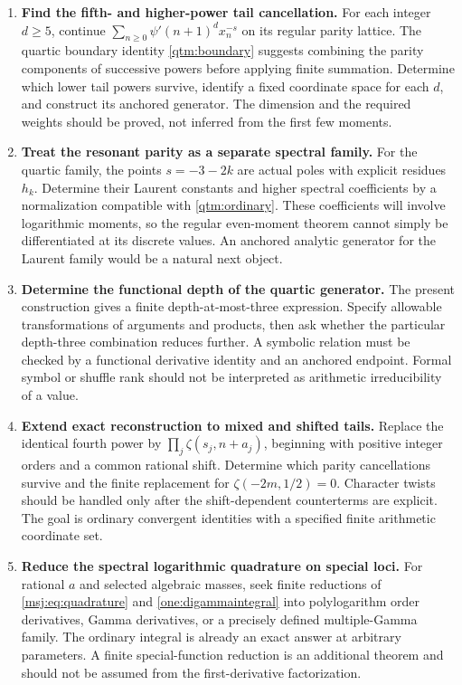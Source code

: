 \begin{enumerate}[leftmargin=*,label=\textbf{R\arabic*.}]
\item \textbf{Find the fifth- and higher-power tail cancellation.}
For each integer $d\ge5$, continue
$\sum_{n\ge0}\psi'(n+1)^d x_n^{-s}$ on its regular parity lattice.
The quartic boundary identity \eqref{qtm:boundary} suggests combining
the parity components of successive powers before applying finite
summation.  Determine which lower tail powers survive, identify a fixed
coordinate space for each $d$, and construct its anchored generator.
The dimension and the required weights should be proved, not inferred
from the first few moments.

\item \textbf{Treat the resonant parity as a separate spectral family.}
For the quartic family, the points $s=-3-2k$ are actual poles with
explicit residues $h_k$.  Determine their Laurent constants and
higher spectral coefficients by a normalization compatible with
\eqref{qtm:ordinary}.  These coefficients will involve logarithmic
moments, so the regular even-moment theorem cannot simply be
differentiated at its discrete values.  An anchored analytic generator
for the Laurent family would be a natural next object.

\item \textbf{Determine the functional depth of the quartic generator.}
The present construction gives a finite depth-at-most-three expression.
Specify allowable transformations of arguments and products, then ask
whether the particular depth-three combination reduces further.
A symbolic relation must be checked by a functional derivative
identity and an anchored endpoint.  Formal symbol or shuffle rank
should not be interpreted as arithmetic irreducibility of a value.

\item \textbf{Extend exact reconstruction to mixed and shifted tails.}
Replace the identical fourth power by
$\prod_j\zeta(s_j,n+a_j)$, beginning with positive integer orders
and a common rational shift.  Determine which parity cancellations
survive and the finite replacement for
$\zeta(-2m,1/2)=0$.  Character twists should be handled only after
the shift-dependent counterterms are explicit.  The goal is ordinary
convergent identities with a specified finite arithmetic coordinate set.

\item \textbf{Reduce the spectral logarithmic quadrature on special loci.}
For rational $a$ and selected algebraic masses, seek finite reductions
of \eqref{msj:eq:quadrature} and \eqref{one:digammaintegral} into
polylogarithm order derivatives, Gamma derivatives, or a precisely
defined multiple-Gamma family.  The ordinary integral is already an
exact answer at arbitrary parameters.  A finite special-function
reduction is an additional theorem and should not be assumed from
the first-derivative factorization.


\end{enumerate}

